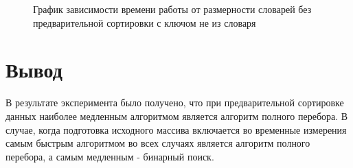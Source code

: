 \begin{figure}[ph!]
	\caption{График зависимости времени работы от размерности словарей без предварительной сортировки с ключом не из словаря}
\end{figure}

\section{Вывод}
В результате эксперимента было получено, что при предварительной сортировке данных наиболее медленным алгоритмом является алгоритм полного перебора. В случае, когда подготовка исходного массива включается во временные измерения самым быстрым алгоритмом во всех случаях является алгоритм полного перебора, а самым медленным - бинарный поиск. 